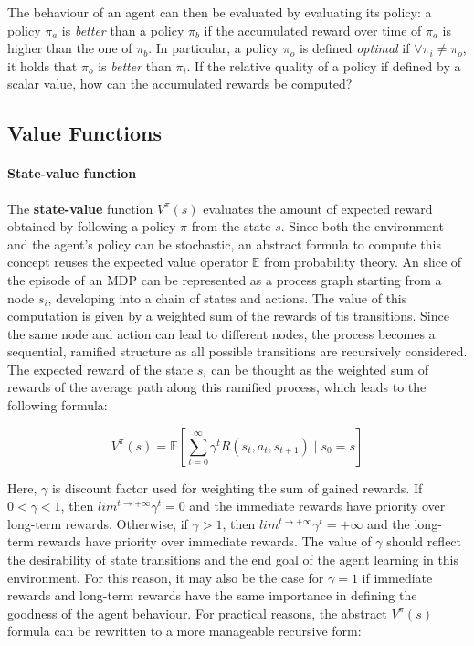 The behaviour of an agent can then be evaluated by evaluating its policy: a policy $\pi _ a$ is \textit{better} than a policy $\pi _ b$ if the accumulated reward over time of $\pi _ a$ is higher than the one of $\pi _ b$.
In particular, a policy $\pi _ o$ is defined \textit{optimal} if $\forall \pi _ i \neq \pi _ o$, it holds that $\pi _o $ is \textit{better} than $\pi _ i$.
If the relative quality of a policy if defined by a scalar value, how can the accumulated rewards be computed?

\subsection{Value Functions}

\paragraph{State-value function}
\label{par:state-value-function}

The \textbf{state-value} function $V^{\pi}(s)$ evaluates the amount of expected reward obtained by following a policy $\pi$ from the state $s$.
Since both the environment and the agent's policy can be stochastic, an abstract formula to compute this concept reuses the expected value operator $\mathbb{E}$ from probability theory.
An slice of the episode of an MDP can be represented as a process graph starting from a node $s_i$, developing into a chain of states and actions. The value of this computation is given by a weighted sum of the rewards of tis transitions.
Since the same node and action can lead to different nodes, the process becomes a sequential, ramified structure as all possible transitions are recursively considered.
The expected reward of the state $s_i$ can be thought as the weighted sum of rewards of the average path along this ramified process, which leads to the following formula:

\begin{equation} \label{eq:v-pi-E}
V^\pi(s) = \mathbb{E} \left[ \sum_{t=0}^{\infty} \gamma^t R(s_t, a_t, s_{t + 1}) \mid s_0 = s \right]
\end{equation}

Here, \textbf{$\gamma$} is discount factor used for weighting the sum of gained rewards. If $0 < \gamma < 1$, then $lim ^ {t \rightarrow +\infty} \gamma ^ t = 0$ and the immediate rewards have priority over long-term rewards. Otherwise, if $\gamma > 1$, then $lim ^ {t \rightarrow +\infty} \gamma ^ t = +\infty$ and the long-term rewards have priority over immediate rewards. The value of $\gamma$ should reflect the desirability of state transitions and the end goal of the agent learning in this environment. For this reason, it may also be the case for $\gamma = 1$ if immediate rewards and long-term rewards have the same importance in defining the goodness of the agent behaviour. For practical reasons, the abstract $V^{\pi}(s)$ formula can be rewritten to a more manageable recursive form:

